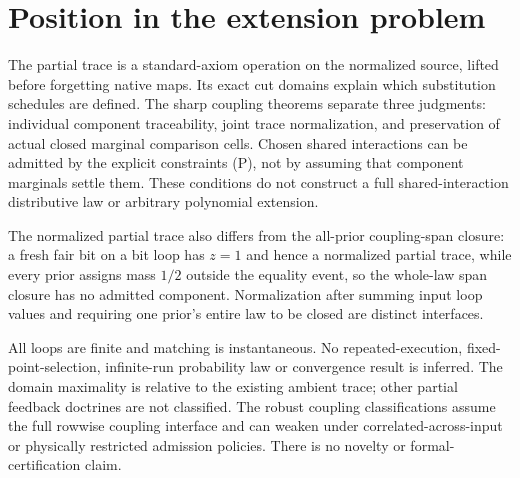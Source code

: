 \documentclass[11pt]{article}
\begin{document}
\section{Position in the extension problem}
The partial trace is a standard-axiom operation on the normalized source, lifted before forgetting native maps. Its exact cut domains explain which substitution schedules are defined. The sharp coupling theorems separate three judgments: individual component traceability, joint trace normalization, and preservation of actual closed marginal comparison cells. Chosen shared interactions can be admitted by the explicit constraints (P), not by assuming that component marginals settle them. These conditions do not construct a full shared-interaction distributive law or arbitrary polynomial extension.

The normalized partial trace also differs from the all-prior coupling-span closure: a fresh fair bit on a bit loop has $z=1$ and hence a normalized partial trace, while every prior assigns mass $1/2$ outside the equality event, so the whole-law span closure has no admitted component. Normalization after summing input loop values and requiring one prior's entire law to be closed are distinct interfaces.

All loops are finite and matching is instantaneous. No repeated-execution, fixed-point-selection, infinite-run probability law or convergence result is inferred. The domain maximality is relative to the existing ambient trace; other partial feedback doctrines are not classified. The robust coupling classifications assume the full rowwise coupling interface and can weaken under correlated-across-input or physically restricted admission policies. There is no novelty or formal-certification claim.
\end{document}
